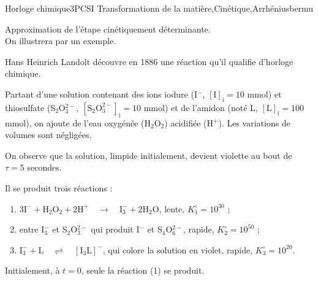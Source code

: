 \begin{exercise}{Horloge chimique}{3}{PCSI}
{Transformationn de la matière,Cinétique,Arrhénius}{bermu}

\begin{questions}
\questioncours Approximation de l’étape cinétiquement déterminante. \\ On illustrera par un exemple.

\begin{EnvUplevel}
     Hans Heinrich Landolt découvre en 1886 une réaction qu'il qualifie d'horloge chimique.
     
     Partant d'une solution contenant des ions iodure (I$^-$, $\mathrm{[I]_i} = 10$ mmol) et thiosulfate (S$_2$O$_3^{2-}$, $\mathrm{[S_2O_3^{2-}]_i} = 10$ mmol) et de l'amidon (noté L, $\mathrm{[L]_i} = 100$ mmol), on ajoute de l'eau oxygénée (H$_2$O$_2$) acidifiée (H$^+$). Les variations de volumes sont négligées.
     
     On observe que la solution, limpide initialement, devient violette au bout de $\tau = 5$ secondes.
     
     Il se produit trois réactions :
     \begin{enumerate}[label={\quad(\arabic*)}]
         \item $\mathrm{3 I^- + H_2O_2 + 2 H^+ \quad\longrightarrow\quad I_3^- + 2 H_2O}$, lente, $K^\circ_1 = 10^{30}$ ;
         \item entre I$_3^-$ et S$_2$O$_3^{2-}$ qui produit I$^-$ et S$_4$O$_6^{2-}$, rapide, $K^\circ_2 = 10^{50}$ ;
         \item $\mathrm{I_3^- + L \quad\rightleftharpoons\quad [I_3L]^-}$, qui colore la solution en violet, rapide, $K^\circ_3 = 10^{20}$.
     \end{enumerate}
\end{EnvUplevel}

\question Initialement, à $t=0$, seule la réaction (1) se produit.
\end{questions}
\end{exercise}
